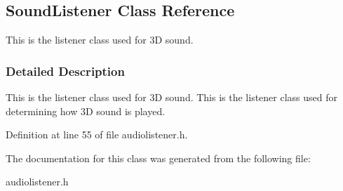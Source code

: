 \hypertarget{classSoundListener}{
\subsection{SoundListener Class Reference}
\label{classSoundListener}
}


This is the listener class used for 3D sound.  




\subsubsection{Detailed Description}
This is the listener class used for 3D sound. This is the listener class used for determining how 3D sound is played. 

Definition at line 55 of file audiolistener.h.



The documentation for this class was generated from the following file:\begin{DoxyCompactItemize}
\item 
audiolistener.h\end{DoxyCompactItemize}
